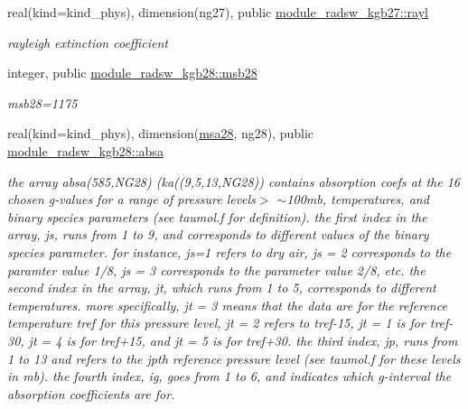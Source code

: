\begin{DoxyCompactItemize}
\mbox{\label{group__module__radsw__kgbnn_gaca4c6e06d1cd46568048a035c6726f1d}} 
real(kind=kind\+\_\+phys), dimension(ng27), public \hyperlink{group__module__radsw__kgbnn_gaca4c6e06d1cd46568048a035c6726f1d}{module\+\_\+radsw\+\_\+kgb27\+::rayl}
\begin{DoxyCompactList}\small\item\em rayleigh extinction coefficient \end{DoxyCompactList}\item 
\mbox{\label{group__module__radsw__kgbnn_ga55d73e39264b431135c6a9c809e20a94}} 
integer, public \hyperlink{group__module__radsw__kgbnn_ga55d73e39264b431135c6a9c809e20a94}{module\+\_\+radsw\+\_\+kgb28\+::msb28}
\begin{DoxyCompactList}\small\item\em msb28=1175 \end{DoxyCompactList}\item 
\mbox{\label{group__module__radsw__kgbnn_ga5e48daf035b3b22b6e1b0f36aabcec10}} 
real(kind=kind\+\_\+phys), dimension(\hyperlink{namespacemodule__radsw__kgb28_a32c6693eb82a3ed47ed13e07f526471a}{msa28}, ng28), public \hyperlink{group__module__radsw__kgbnn_ga5e48daf035b3b22b6e1b0f36aabcec10}{module\+\_\+radsw\+\_\+kgb28\+::absa}
\begin{DoxyCompactList}\small\item\em the array absa(585,\+N\+G28) (ka((9,5,13,\+N\+G28)) contains absorption coefs at the 16 chosen g-\/values for a range of pressure levels$>$ $\sim$100mb, temperatures, and binary species parameters (see taumol.\+f for definition). the first index in the array, js, runs from 1 to 9, and corresponds to different values of the binary species parameter. for instance, js=1 refers to dry air, js = 2 corresponds to the paramter value 1/8, js = 3 corresponds to the parameter value 2/8, etc. the second index in the array, jt, which runs from 1 to 5, corresponds to different temperatures. more specifically, jt = 3 means that the data are for the reference temperature tref for this pressure level, jt = 2 refers to tref-\/15, jt = 1 is for tref-\/30, jt = 4 is for tref+15, and jt = 5 is for tref+30. the third index, jp, runs from 1 to 13 and refers to the jpth reference pressure level (see taumol.\+f for these levels in mb). the fourth index, ig, goes from 1 to 6, and indicates which g-\/interval the absorption coefficients are for. \end{DoxyCompactList}\item 

\end{DoxyCompactItemize}
